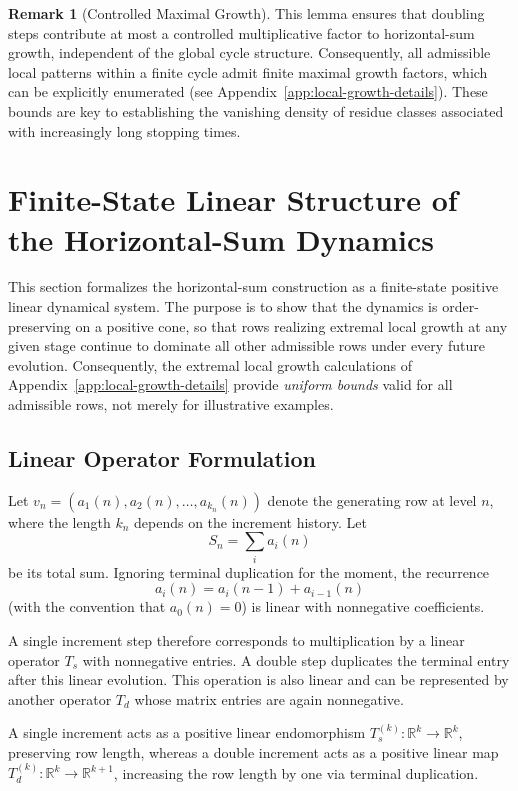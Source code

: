 \documentclass[12pt, oneside]{article}   	%
\numberwithin{equation}{section}          %
\theoremstyle{definition}
\newtheorem*{remark}{Remark}
\begin{document}
\begin{remark}[Controlled Maximal Growth]
This lemma ensures that doubling steps contribute at most a controlled multiplicative
factor to horizontal-sum growth, independent of the global cycle structure. Consequently,
all admissible local patterns within a finite cycle admit finite maximal growth factors,
which can be explicitly enumerated (see Appendix~\ref{app:local-growth-details}).  
These bounds are key to establishing the vanishing density of residue classes
associated with increasingly long stopping times.
\end{remark}


\newpage
\section{Finite-State Linear Structure of the Horizontal-Sum Dynamics}
\label{sec:linear-framework}

This section formalizes the horizontal-sum construction as a finite-state
positive linear dynamical system.  The purpose is to show that the dynamics
is order-preserving on a positive cone, so that rows realizing extremal
local growth at any given stage continue to dominate all other admissible
rows under every future evolution.  Consequently, the extremal local growth
calculations of Appendix~\ref{app:local-growth-details} provide \emph{uniform
bounds} valid for all admissible rows, not merely for illustrative examples.


\subsection{Linear Operator Formulation}

Let $v_n = (a_1(n),a_2(n),\dots,a_{k_n}(n))$ denote the generating row at
level $n$, where the length $k_n$ depends on the increment history.
Let
\[
S_n = \sum_i a_i(n)
\]
be its total sum. Ignoring terminal duplication for the moment, the recurrence
\[
a_i(n)=a_i(n-1)+a_{i-1}(n)
\]
(with the convention that $a_0(n)=0$) is linear with nonnegative coefficients.

A single increment step therefore corresponds to multiplication by a linear
operator $T_s$ with nonnegative entries. A double step duplicates the terminal
entry after this linear evolution. This operation is also linear and can be
represented by another operator $T_d$ whose matrix entries are again nonnegative.

A single increment acts as a positive linear endomorphism
$T_s^{(k)} : \mathbb{R}^{k} \to \mathbb{R}^{k}$, preserving row length, whereas
a double increment acts as a positive linear map
$T_d^{(k)} : \mathbb{R}^{k} \to \mathbb{R}^{k+1}$, increasing the row length by one
via terminal duplication.
\end{document}
